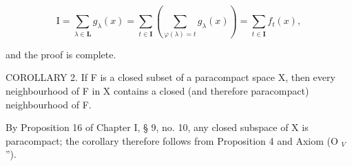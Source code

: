 \[
\mathrm{I} = \sum_ {\lambda \in \mathbf {L}} g _ {\lambda} (x) = \sum_ {t \in \mathbf {I}} \left(\sum_ {\varphi (\lambda) = t} g _ {\lambda} (x)\right) = \sum_ {t \in \mathbf {I}} f _ {t} (x),
\]

and the proof is complete.

COROLLARY 2. If F is a closed subset of a paracompact space X, then every neighbourhood of F in X contains a closed (and therefore paracompact) neighbourhood of F.

By Proposition 16 of Chapter I, § 9, no. 10, any closed subspace of X is paracompact; the corollary therefore follows from Proposition 4 and Axiom (O \(_{V}\) '').
